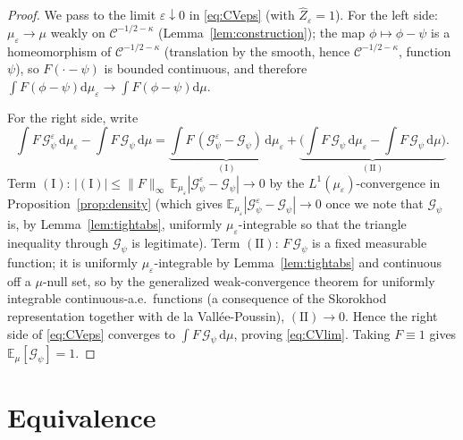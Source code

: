 \documentclass[12pt]{article}
\theoremstyle{definition}
\newcommand{\E}{\mathbb{E}}
\newcommand{\dd}{\mathrm{d}}
\begin{document}
\begin{proof}
We pass to the limit $\varepsilon\downarrow0$ in \eqref{eq:CVeps} (with
$\widehat Z_\varepsilon=1$). For the left side: $\mu_\varepsilon\to\mu$ weakly on
$\mathcal C^{-1/2-\kappa}$ (Lemma~\ref{lem:construction}); the map $\phi\mapsto\phi-\psi$
is a homeomorphism of $\mathcal C^{-1/2-\kappa}$ (translation by the smooth, hence
$\mathcal C^{-1/2-\kappa}$, function $\psi$), so $F(\cdot-\psi)$ is bounded continuous,
and therefore $\int F(\phi-\psi)\dd\mu_\varepsilon\to\int F(\phi-\psi)\dd\mu$.

For the right side, write
\[
  \int F\,\mathcal G^\varepsilon_\psi\,\dd\mu_\varepsilon
  -\int F\,\mathcal G_\psi\,\dd\mu
  =\underbrace{\int F\,(\mathcal G^\varepsilon_\psi-\mathcal G_\psi)\,\dd\mu_\varepsilon}_{(\mathrm I)}
   +\underbrace{\Big(\int F\,\mathcal G_\psi\,\dd\mu_\varepsilon-\int F\,\mathcal G_\psi\,\dd\mu\Big)}_{(\mathrm{II})}.
\]
Term $(\mathrm I)$: $|(\mathrm I)|\le\|F\|_\infty\,\E_{\mu_\varepsilon}|\mathcal G^\varepsilon_\psi-\mathcal G_\psi|\to0$
by the $L^1(\mu_\varepsilon)$-convergence in Proposition~\ref{prop:density} (which
gives $\E_{\mu_\varepsilon}|\mathcal G^\varepsilon_\psi-\mathcal G_\psi|\to0$ once we note that
$\mathcal G_\psi$ is, by Lemma~\ref{lem:tightabs}, uniformly $\mu_\varepsilon$-integrable
so that the triangle inequality through $\mathcal G_\psi$ is legitimate). Term
$(\mathrm{II})$: $F\,\mathcal G_\psi$ is a fixed measurable function; it is uniformly
$\mu_\varepsilon$-integrable by Lemma~\ref{lem:tightabs} and continuous off a
$\mu$-null set, so by the generalized weak-convergence theorem for uniformly integrable
continuous-a.e.\ functions (a consequence of the Skorokhod representation together with
de la Vall\'ee-Poussin), $(\mathrm{II})\to0$. Hence the right side of \eqref{eq:CVeps}
converges to $\int F\,\mathcal G_\psi\,\dd\mu$, proving \eqref{eq:CVlim}. Taking
$F\equiv1$ gives $\E_\mu[\mathcal G_\psi]=1$.
\end{proof}

\section{Equivalence}\label{sec:concl}
\end{document}
